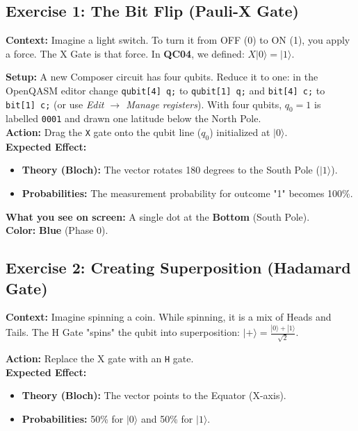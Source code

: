 \documentclass[a4paper,11pt]{article}
\begin{document}
\subsection{Exercise 1: The Bit Flip (Pauli-X Gate)}
\textbf{Context:} Imagine a light switch. To turn it from OFF (0) to ON (1), you apply a force. The X Gate is that force.
In \textbf{QC04}, we defined: $X|0\rangle = |1\rangle$.

\begin{studentbox}
\textbf{Setup:} A new Composer circuit has four qubits. Reduce it to one: in the OpenQASM editor change \texttt{qubit[4] q;} to \texttt{qubit[1] q;} and \texttt{bit[4] c;} to \texttt{bit[1] c;} (or use \textit{Edit $\rightarrow$ Manage registers}). With four qubits, $q_0 = 1$ is labelled \texttt{0001} and drawn one latitude below the North Pole.\\
\textbf{Action:} Drag the \texttt{X} gate onto the qubit line ($q_0$) initialized at $|0\rangle$.
\\
\textbf{Expected Effect:}
\begin{itemize}
    \item \textbf{Theory (Bloch):} The vector rotates 180 degrees to the South Pole ($|1\rangle$).
    \item \textbf{Probabilities:} The measurement probability for outcome "1" becomes 100\%.
\end{itemize}
\end{studentbox}

\begin{composerbox}
\textbf{What you see on screen:} A single dot at the \textbf{Bottom} (South Pole).
\\
\textbf{Color:} \textcolor{ibmblue}{\textbf{Blue}} (Phase 0).
\end{composerbox}

\subsection{Exercise 2: Creating Superposition (Hadamard Gate)}
\textbf{Context:} Imagine spinning a coin. While spinning, it is a mix of Heads and Tails. The H Gate "spins" the qubit into superposition: $|+\rangle = \frac{|0\rangle + |1\rangle}{\sqrt{2}}$.

\begin{studentbox}
\textbf{Action:} Replace the X gate with an \texttt{H} gate.
\\
\textbf{Expected Effect:}
\begin{itemize}
    \item \textbf{Theory (Bloch):} The vector points to the Equator (X-axis).
    \item \textbf{Probabilities:} 50\% for $|0\rangle$ and 50\% for $|1\rangle$.
\end{itemize}
\end{studentbox}
\end{document}
